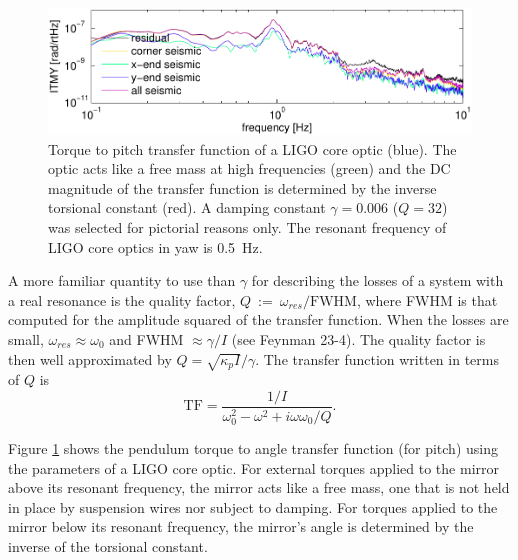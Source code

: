 \begin{figure}
\begin{centering}
\includegraphics[width=1.0\textwidth]{figures/myplot.pdf}
\caption{Torque to pitch transfer function of a LIGO core optic
  (blue). The optic acts like a free mass at high frequencies (green)
  and the DC magnitude of the transfer function is determined by the
  inverse torsional constant (red). A damping constant $\gamma =
  0.006$ ($Q=32$) was selected for pictorial reasons only. The
  resonant frequency of LIGO core optics in yaw is 0.5~Hz.}
\label{fig:pendTF}
\end{centering}
\end{figure}

A more familiar quantity to use than $\gamma$ for describing the
losses of a system with a real resonance is the quality factor,
$Q~:=~\omega_{res}/\mathrm{FWHM}$, where FWHM is that computed for the
amplitude squared of the transfer function. When the losses are small,
$\omega_{res} \approx \omega_0$ and FWHM $\approx \gamma/I$ (see
Feynman 23-4). The quality factor is then well approximated by $Q =
\sqrt{\kappa_p I}/\gamma$. The transfer function written in terms of
$Q$ is
\begin{equation}
\mathrm{TF} = \frac{1/I}{\omega_0^2  - \omega^2 + i \omega \omega_0 / Q}.
\label{eq:TFpendulum}
\end{equation}

Figure \ref{fig:pendTF} shows the pendulum torque to angle transfer
function (for pitch) using the parameters of a LIGO core optic. For
external torques applied to the mirror above its resonant frequency,
the mirror acts like a free mass, one that is not held in place by
suspension wires nor subject to damping. For torques applied to the
mirror below its resonant frequency, the mirror's angle is determined
by the inverse of the torsional constant.





